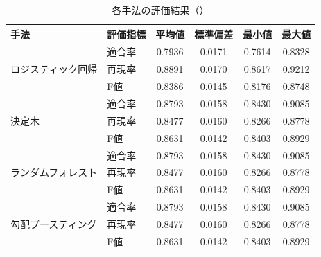 \begin{table}[tb]
    \caption{各手法の評価結果（\testfirst）}
    \label{tab:all_single_metrics_prospect}
    \centering
    \begin{tabular}{llcccc}
        \hline
        手法 & 評価指標 & 平均値 & 標準偏差 & 最小値 & 最大値 \\\hline \hline
        \multirow{3}{*}{ロジスティック回帰} & 適合率& 0.7936 & 0.0171 & 0.7614 & 0.8328 \\
         & 再現率& 0.8891 & 0.0170 & 0.8617 & 0.9212 \\
         & F値& 0.8386 & 0.0145 & 0.8176 & 0.8748 \\\hline
        \multirow{3}{*}{決定木} & 適合率& 0.8793 & 0.0158 & 0.8430 & 0.9085 \\
         & 再現率& 0.8477 & 0.0160 & 0.8266 & 0.8778 \\
         & F値& 0.8631 & 0.0142 & 0.8403 & 0.8929 \\\hline
        \multirow{3}{*}{ランダムフォレスト} & 適合率& 0.8793 & 0.0158 & 0.8430 & 0.9085 \\
         & 再現率& 0.8477 & 0.0160 & 0.8266 & 0.8778 \\
         & F値& 0.8631 & 0.0142 & 0.8403 & 0.8929 \\\hline
        \multirow{3}{*}{勾配ブースティング} & 適合率& 0.8793 & 0.0158 & 0.8430 & 0.9085 \\
         & 再現率& 0.8477 & 0.0160 & 0.8266 & 0.8778 \\
         & F値& 0.8631 & 0.0142 & 0.8403 & 0.8929 \\\hline
    \end{tabular}
\end{table}
